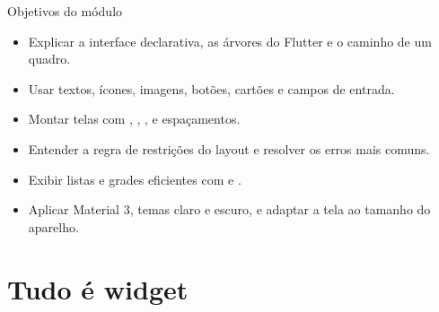 \documentclass[aspectratio=169,10pt]{beamer}
\begin{document}
\capa

\begin{frame}{Objetivos do módulo}
  \begin{conceito}
    \begin{itemize}
      \item Explicar a interface declarativa, as árvores do Flutter e o caminho de um quadro.
      \item Usar textos, ícones, imagens, botões, cartões e campos de entrada.
      \item Montar telas com , , ,  e espaçamentos.
      \item Entender a regra de restrições do layout e resolver os erros mais comuns.
      \item Exibir listas e grades eficientes com  e .
      \item Aplicar Material 3, temas claro e escuro, e adaptar a tela ao tamanho do aparelho.
    \end{itemize}
  \end{conceito}
\end{frame}

\sumario



\section{Tudo é widget}
\end{document}
